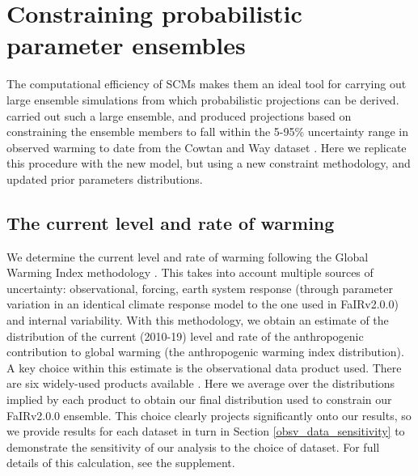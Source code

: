\documentclass[gmd, manuscript]{copernicus}
\begin{document}
\section{Constraining probabilistic parameter ensembles} \label{NROY}
The computational efficiency of SCMs makes them an ideal tool for carrying out large ensemble simulations from which probabilistic projections can be derived. \cite{Smith2018} carried out such a large ensemble, and produced projections based on constraining the ensemble members to fall within the 5-95\% uncertainty range in observed warming to date from the Cowtan and Way dataset \citep{Cowtan2014}. Here we replicate this procedure with the new model, but using a new constraint methodology, and updated prior parameters distributions.
\subsection{The current level and rate of warming} \label{GWI}
We determine the current level and rate of warming following the Global Warming Index methodology \citep{Haustein2017}. This takes into account multiple sources of uncertainty: observational, forcing, earth system response (through parameter variation in an identical climate response model to the one used in FaIRv2.0.0) and internal variability. With this methodology, we obtain an estimate of the distribution of the current (2010-19) level and rate of the anthropogenic contribution to global warming (the anthropogenic warming index distribution). A key choice within this estimate is the observational data product used. There are six widely-used products available \citep{Lenssen2019,Cowtan2014,Vose2012,Morice2011,Rohde2013,Morice2020}. Here we average over the distributions implied by each product to obtain our final distribution used to constrain our FaIRv2.0.0 ensemble. This choice clearly projects significantly onto our results, so we provide results for each dataset in turn in Section \ref{obsv_data_sensitivity} to demonstrate the sensitivity of our analysis to the choice of dataset. For full details of this calculation, see the supplement.
\end{document}
